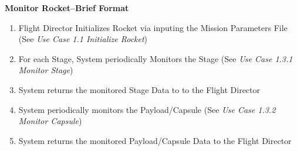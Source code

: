 \documentclass[letterpaper]{article}
\begin{document}
\noindent
\textbf{Monitor Rocket--Brief Format}
\begin{enumerate}
   \item Flight Director Initializes Rocket via inputing the Mission
      Parameters File (See \textit{Use Case 1.1 Initialize Rocket})
   \item For each Stage, System periodically Monitors the Stage (See
      \textit{Use Case 1.3.1 Monitor Stage})
   \item System returns the monitored Stage Data to to the Flight
      Director
   \item System periodically monitors the Payload/Capsule (See
      \textit{Use Case 1.3.2 Monitor Capsule})
   \item System returns the monitored Payload/Capsule Data to the
      Flight Director
\end{enumerate}
\end{document}
